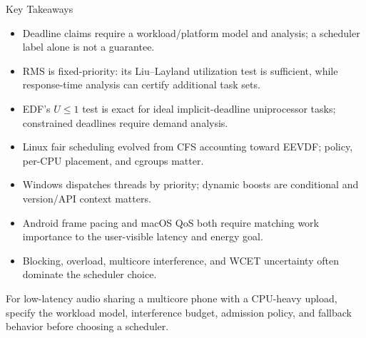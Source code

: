 \documentclass[aspectratio=169,11pt]{beamer}
\begin{document}
\begin{frame}{Key Takeaways}
  \scriptsize
  \begin{itemize}
    \item Deadline claims require a workload/platform model and analysis; a scheduler label alone is not a guarantee.
    \item RMS is fixed-priority: its Liu--Layland utilization test is sufficient, while response-time analysis can certify additional task sets.
    \item EDF's $U\leq1$ test is exact for ideal implicit-deadline uniprocessor tasks; constrained deadlines require demand analysis.
    \item Linux fair scheduling evolved from CFS accounting toward EEVDF; policy, per-CPU placement, and cgroups matter.
    \item Windows dispatches threads by priority; dynamic boosts are conditional and version/API context matters.
    \item Android frame pacing and macOS QoS both require matching work importance to the user-visible latency and energy goal.
    \item Blocking, overload, multicore interference, and WCET uncertainty often dominate the scheduler choice.
  \end{itemize}

  \begin{tcolorbox}[title=\textbf{Reflection Prompt: The Scheduler's Dilemma}, colback=blue!5!white, colframe=blue!75!black, fonttitle=\bfseries]
  For low-latency audio sharing a multicore phone with a CPU-heavy upload, specify the workload model, interference budget, admission policy, and fallback behavior before choosing a scheduler.
  \end{tcolorbox}
\end{frame}
\end{document}
